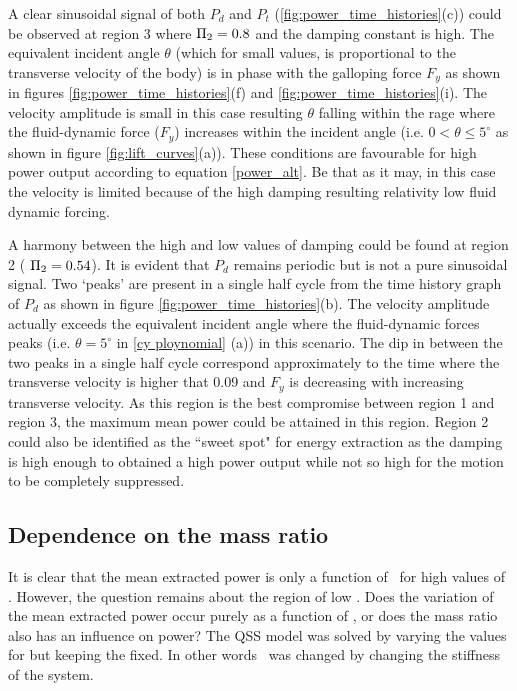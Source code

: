 A clear sinusoidal signal of both $P_d$ and $P_t$ (\ref{fig:power_time_histories}(c)) could be observed at region 3 where $\Pi_2=0.8$ and the damping constant is high. The equivalent incident angle $\theta$ (which for small values, is proportional to the transverse velocity of the body) is in phase with the galloping force $F_y$ as shown in figures \ref{fig:power_time_histories}(f) and  \ref{fig:power_time_histories}(i). The velocity amplitude is small in this case resulting $\theta$ falling within the rage where the fluid-dynamic force ($F_y$) increases within the incident angle (i.e. $0<\theta \leq 5^\circ$ as shown in figure \ref{fig:lift_curves}(a)). These conditions are favourable for high power output according to equation \ref{power_alt}. Be that as it may, in this case the velocity is limited because of the high damping resulting relativity low fluid dynamic forcing. 

A harmony between the high and low values of damping could be found at region 2  ( $\Pi_2=0.54$). It is evident that $P_d$ remains periodic but is not a pure sinusoidal signal. Two `peaks' are present in a single half cycle from the time history graph of $P_d$ as shown in figure \ref{fig:power_time_histories}(b). The velocity amplitude actually exceeds the equivalent incident angle where the fluid-dynamic forces peaks (i.e. $\theta=5^\circ$ in \ref{cy ploynomial} (a)) in this scenario. The dip in between the two peaks in a single half cycle correspond approximately to the time where the transverse velocity is higher that 0.09 and $F_y$ is decreasing with increasing transverse velocity. As this region is the best compromise between region 1 and region 3, the maximum mean power could be attained in this region. Region 2 could also be identified as the ``sweet spot" for energy extraction as the damping is high enough to obtained a high power output while not so high for the motion to be completely suppressed. 


\subsection{Dependence on the mass ratio \mstar}
\label{sec:chp-pi_1_pi2_mstar}


It is clear that the mean extracted power is only a function of \massdamp \ for high values of \massstiff. However, the question remains about the region of low \massstiff. Does the variation of the mean extracted power occur purely as a function of \massstiff, or does the mass ratio also has an influence on power? The QSS model was solved by varying the values for \mstar
but keeping the \massstiff fixed. In other words \massstiff\ was changed by changing the stiffness of the system. 
 
